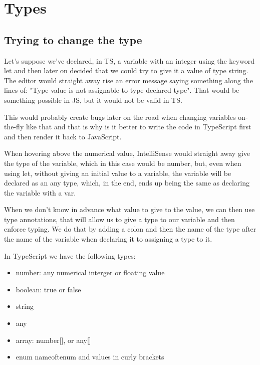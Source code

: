 \chapter{Types}
\section{Trying to change the type}
Let's suppose we've declared, in TS, a variable with an integer using the keyword let and then later on decided that we could try to give it a value of type string. The editor would straight away rise an error message saying something along the lines of: "Type value is not assignable to type declared-type". That would be something possible in JS, but it would not be valid in TS.

This would probably create bugs later on the road when changing variables on-the-fly like that and that is why is it better to write the code in TypeScript first and then render it back to JavaScript.

When hovering above the numerical value, IntelliSense would straight away give the type of the variable, which in this case would be number, but, even when using let, without giving an initial value to a variable, the variable will be declared as an any type, which, in the end, ends up being the same as declaring the variable with a var.

When we don't know in advance what value to give to the value, we can then use type annotations, that will allow us to give a type to our variable and then enforce typing. We do that by adding a colon and then the name of the type after the name of the variable when declaring it to assigning a type to it.

In TypeScript we have the following types:
\begin{itemize}
    \item number: any numerical interger or floating value
    \item boolean: true or false
    \item string
    \item any
    \item array: number[], or any[]
    \item enum nameoftenum and values in curly brackets
\end{itemize}